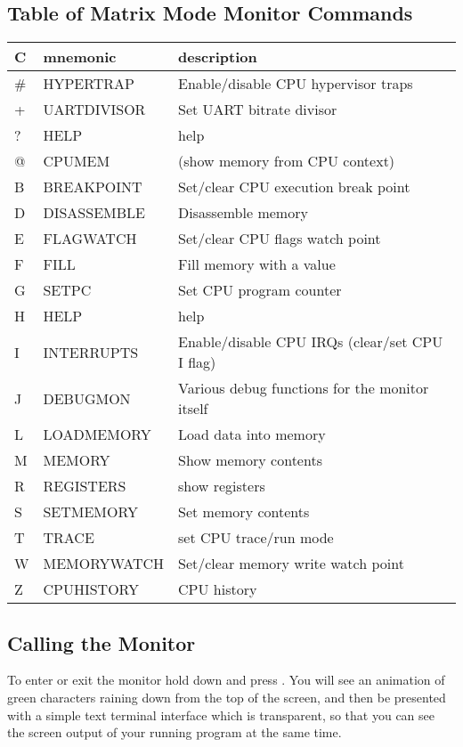 \subsection{Table of Matrix Mode Monitor Commands}

{
\ttfamily
\setlength{\tabcolsep}{1mm}
\begin{center}
\begin{tabular}{|l|l|l|}
\hline
C & mnemonic & description \\
\hline
\# & HYPERTRAP & Enable/disable CPU hypervisor traps \\
+ & UARTDIVISOR & Set UART bitrate divisor \\
? & HELP & help \\
@ & CPUMEM & (show memory from CPU context) \\
\hline
B & BREAKPOINT & Set/clear CPU execution break point \\
D & DISASSEMBLE & Disassemble memory \\
E & FLAGWATCH & Set/clear CPU flags watch point \\
F & FILL & Fill memory with a value \\
G & SETPC & Set CPU program counter \\
H & HELP & help \\
I & INTERRUPTS & Enable/disable CPU IRQs (clear/set CPU I flag) \\
J & DEBUGMON & Various debug functions for the monitor itself \\
L & LOADMEMORY & Load data into memory \\
M & MEMORY & Show memory contents \\
R & REGISTERS & show registers \\
S & SETMEMORY & Set memory contents \\
T & TRACE & set CPU trace/run mode \\
W & MEMORYWATCH & Set/clear memory write watch point \\
Z & CPUHISTORY & CPU history \\
\hline
\end{tabular}
\end{center}
}

\subsection {Calling the Monitor}

To enter or exit the monitor hold down \megasymbolkey and press .
You will see an animation of green characters raining down from the top of the screen, and
then be presented with a simple text terminal interface which is transparent, so that you can
see the screen output of your running program at the same time.

